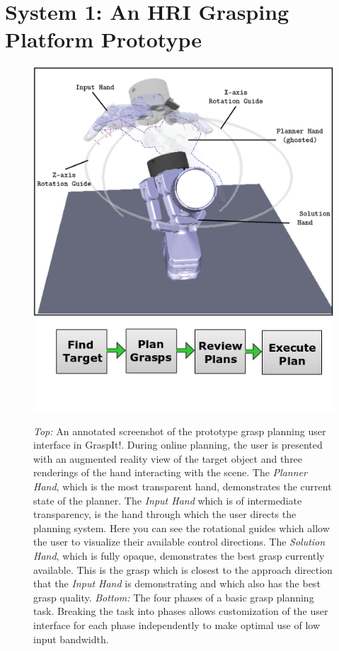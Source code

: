 \section*{System 1: An HRI Grasping Platform Prototype}
\setcounter{subsection}{0}
\label{sec:pipeline_1}
\begin{figure}
	\centering
	\includegraphics[width=.95\columnwidth]{ui_1.png}\\
	\includegraphics[width=.99\columnwidth]{images_4/overview_pipeline.png}\\
	\caption{ \emph{Top:} An annotated screenshot of the prototype grasp planning user interface in GraspIt!. During online planning, the user is presented with an augmented reality view of the target object and three renderings of the hand interacting with the scene. The \emph{Planner Hand}, which is the most transparent hand, demonstrates the current state of the planner. The \emph{Input Hand} which is of intermediate transparency, is the hand through which the user directs the planning system. Here you can see the rotational guides which allow the user to visualize their available control directions. The \emph{Solution Hand}, which is fully opaque, demonstrates the best grasp currently available. This is the grasp which is closest to the approach direction that the \emph{Input Hand} is demonstrating and which also has the best grasp quality. \emph{Bottom:} The four phases of a basic grasp planning task. Breaking the task into phases allows customization of the user interface for each phase independently to make optimal use of low input bandwidth.}
	\label{fig:overview_pipeline}
\end{figure}
